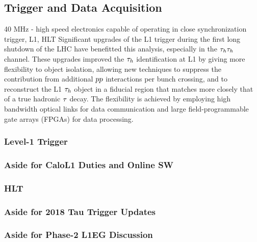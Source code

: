 \subsection{Trigger and Data Acquisition}
40 MHz - high speed electronics capable of operating in close synchronization
trigger, L1, HLT
Significant upgrades of the L1 trigger during the first long shutdown of the LHC have benefitted this analysis, especially in the $\tau_{h}\tau_{h}$ channel. These upgrades improved the $\tau_{h}$ identification at L1 by giving more flexibility to object isolation, allowing new techniques to suppress the contribution from additional $pp$ interactions per bunch
crossing, and to reconstruct the L1 $\tau_{h}$ object in a fiducial region that matches more closely that of a true hadronic $\tau$ decay. The flexibility is achieved by employing high bandwidth optical links for data communication and large field-programmable gate arrays (FPGAs) for data processing.

\subsubsection{Level-1 Trigger}
\subsubsection{Aside for CaloL1 Duties and Online SW}
\subsubsection{HLT}
\subsubsection{Aside for 2018 Tau Trigger Updates}
\subsubsection{Aside for Phase-2 L1EG Discussion}
